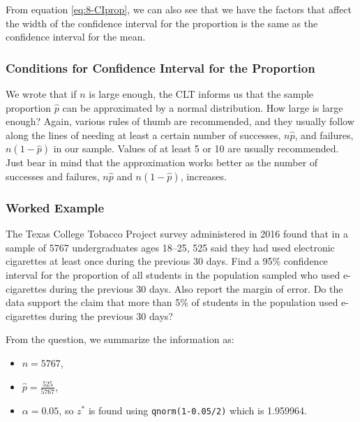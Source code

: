 \documentclass[
]{book}
\providecommand{\tightlist}{%
  \setlength{\itemsep}{0pt}\setlength{\parskip}{0pt}}
\begin{document}
From equation \eqref{eq:8-CIprop}, we can also see that we have the factors that affect the width of the confidence interval for the proportion is the same as the confidence interval for the mean.

\hypertarget{conditions-for-confidence-interval-for-the-proportion}{%
\subsubsection{Conditions for Confidence Interval for the Proportion}\label{conditions-for-confidence-interval-for-the-proportion}}

We wrote that if \(n\) is large enough, the CLT informs us that the sample proportion \(\hat{p}\) can be approximated by a normal distribution. How large is large enough? Again, various rules of thumb are recommended, and they usually follow along the lines of needing at least a certain number of successes, \(n\hat{p}\), and failures, \(n(1-\hat{p})\) in our sample. Values of at least 5 or 10 are usually recommended. Just bear in mind that the approximation works better as the number of successes and failures, \(n\hat{p}\) and \(n(1-\hat{p})\), increases.

\hypertarget{worked-example-3}{%
\subsubsection{Worked Example}\label{worked-example-3}}

The Texas College Tobacco Project survey administered in 2016 found that in a sample of 5767 undergraduates ages 18--25, 525 said they had used electronic cigarettes at least once during the previous 30 days. Find a 95\% confidence interval for the proportion of all students in the population sampled who used e-cigarettes during the previous 30 days. Also report the margin of error. Do the data support the claim that more than 5\% of students in the population used e-cigarettes during the previous 30 days?

From the question, we summarize the information as:

\begin{itemize}
\tightlist
\item
  \(n = 5767\),
\item
  \(\hat{p} = \frac{525}{5767}\),
\item
  \(\alpha = 0.05\), so \(z^*\) is found using \texttt{qnorm(1-0.05/2)} which is 1.959964.
\end{itemize}
\end{document}
